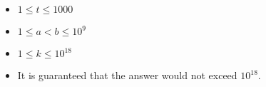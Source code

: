 \begin{itemize}
    \tightlist
    \item $1 \leq t \leq 1000$
    \item $1 \leq a < b \leq 10^9$
    \item $1 \leq k \leq 10^{18}$
    \item It is guaranteed that the answer would not exceed $10^{18}$.
\end{itemize}

